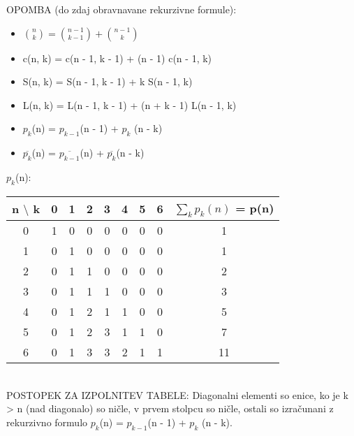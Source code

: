 \documentclass[a4paper,12pt]{article}
\theoremstyle{definition}
\theoremstyle{remark}
\begin{document}
OPOMBA (do zdaj obravnavane rekurzivne formule):\\
\begin{itemize}
    \item $\binom{n}{k} = \binom{n - 1}{k - 1} + \binom{n - 1}{k}$
    \item c(n, k) = c(n - 1, k - 1) + (n - 1) c(n - 1, k)
    \item S(n, k) = S(n - 1, k - 1) + k S(n - 1, k)
    \item L(n, k) = L(n - 1, k - 1) + (n + k - 1) L(n - 1, k)
    \item $p_k$(n) = $p_{k - 1}$(n - 1) + $p_k$ (n - k)
    \item $\overline{p_k}$(n) = $\overline{p_{k - 1}}$(n) + $\overline{p_k}$(n - k)
\end{itemize}

$p_k$(n):\\
\begin{tabular}{c|c c c c c c c|c}
    n $\setminus$ k & 0 & 1 & 2 & 3 & 4 & 5 & 6 & $\sum_k p_k(n)$ = p(n) \\
    \hline
    0 & 1 & 0 & 0 & 0 & 0 & 0 & 0 & 1 \\
    1 & 0 & 1 & 0 & 0 & 0 & 0 & 0 & 1 \\
    2 & 0 & 1 & 1 & 0 & 0 & 0 & 0 & 2 \\
    3 & 0 & 1 & 1 & 1 & 0 & 0 & 0 & 3 \\
    4 & 0 & 1 & 2 & 1 & 1 & 0 & 0 & 5 \\
    5 & 0 & 1 & 2 & 3 & 1 & 1 & 0 & 7 \\
    6 & 0 & 1 & 3 & 3 & 2 & 1 & 1 & 11 \\
\end{tabular}\\

POSTOPEK ZA IZPOLNITEV TABELE: Diagonalni elementi so enice, ko je k > n (nad diagonalo) so ničle, v prvem stolpcu so ničle, ostali so izračunani z rekurzivno formulo $p_k$(n) = $p_{k - 1}$(n - 1) + $p_k$ (n - k).

\end{document}
